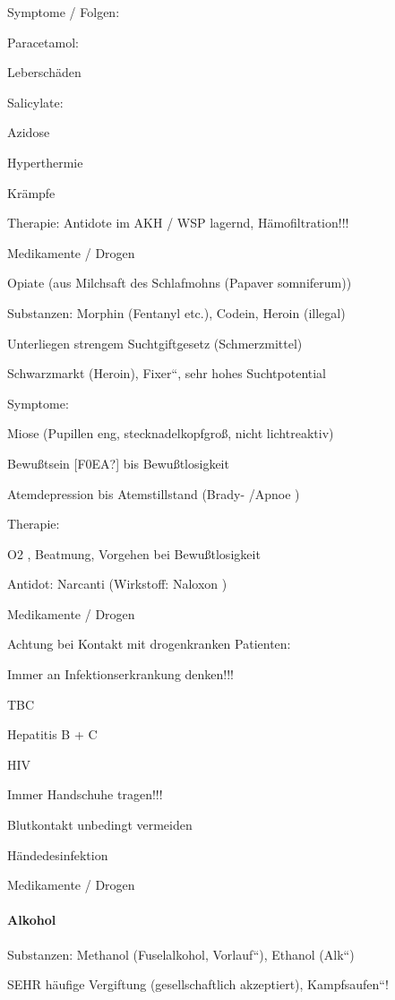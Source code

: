 \documentclass{article}
\begin{document}
Symptome / Folgen:

Paracetamol: 

Lebersch\"aden

Salicylate: 

Azidose

Hyperthermie

Kr\"ampfe

Therapie: Antidote im AKH / WSP lagernd,  H\"amofiltration!!!

Medikamente / Drogen

Opiate  (aus Milchsaft des Schlafmohns (Papaver somniferum))

Substanzen: Morphin (Fentanyl{\textregistered} etc.), Codein, Heroin
(illegal)

Unterliegen strengem Suchtgiftgesetz (Schmerzmittel)

Schwarzmarkt (Heroin), {\quotedblbase}Fixer{\textquotedblleft}, sehr
hohes Suchtpotential

Symptome:

Miose (Pupillen eng, stecknadelkopfgro{\ss}, nicht  lichtreaktiv)

Bewu{\ss}tsein [F0EA?]  bis Bewu{\ss}tlosigkeit

Atemdepression bis Atemstillstand (Brady- /Apnoe )

Therapie:

O2 , Beatmung, Vorgehen bei Bewu{\ss}tlosigkeit

Antidot: Narcanti{\textregistered}  (Wirkstoff: Naloxon )

Medikamente / Drogen

Achtung bei Kontakt mit drogenkranken  Patienten:

Immer  an Infektionserkrankung denken!!!

TBC

Hepatitis B + C

HIV

Immer Handschuhe tragen!!!

Blutkontakt unbedingt vermeiden

H\"andedesinfektion 

Medikamente / Drogen

\paragraph{Alkohol}
Substanzen: Methanol (Fuselalkohol,
{\quotedblbase}Vorlauf{\textquotedblleft}), Ethanol
({\quotedblbase}Alk{\textquotedblleft})

SEHR h\"aufige Vergiftung (gesellschaftlich akzeptiert),
{\quotedblbase}Kampfsaufen{\textquotedblleft}!
\end{document}
